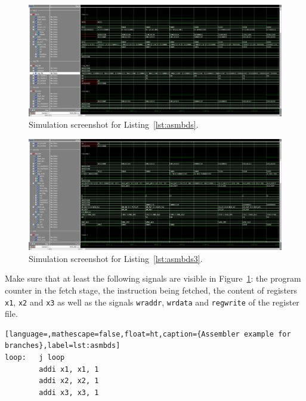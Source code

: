\begin{figure}[ht!]
  \centering
  \includegraphics[width=1.0\linewidth]{task_2_fetch_regfile.png}
  \caption{Simulation screenshot for Listing~\ref{lst:asmbds}.}
  \label{fig:sim2}
\end{figure}

\begin{figure}[ht!]
  \centering
  \includegraphics[width=1.0\linewidth]{task_2_decode.png}
  \caption{Simulation screenshot for Listing~\ref{lst:asmbds3}.}
  \label{fig:sim3}
\end{figure}

Make sure that at least the following signals are visible in
Figure~\ref{fig:sim2}: the program counter in the fetch stage, the
instruction being fetched, the content of registers \texttt{x1}, 
\texttt{x2} and \texttt{x3} as well as the signals \texttt{wraddr},
\texttt{wrdata} and \texttt{regwrite} of the register file.

\begin{lstlisting}[language=,mathescape=false,float=ht,caption={Assembler example for branches},label=lst:asmbds]
loop:   j loop
        addi x1, x1, 1
        addi x2, x2, 1
        addi x3, x3, 1
\end{lstlisting}

